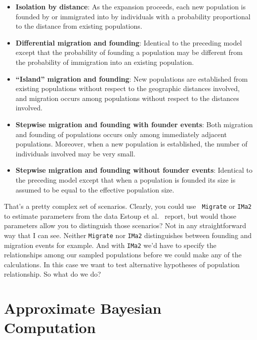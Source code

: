 \begin{itemize}

\item {\bf Isolation by distance}: As the expansion proceeds, each new
  population is founded by or immigrated into by individuals with a
  probability proportional to the distance from existing populations.

\item {\bf Differential migration and founding}: Identical to the
  preceding model except that the probability of founding a population
  may be different from the probability of immigration into an
  existing population.

\item {\bf ``Island'' migration and founding}: New populations are
  established from existing populations without respect to the
  geographic distances involved, and migration occurs among
  populations without respect to the distances involved.

\item {\bf Stepwise migration and founding with founder events}: Both
  migration and founding of populations occurs only among immediately
  adjacent populations. Moreover, when a new population is
  established, the number of individuals involved may be very small.

\item {\bf Stepwise migration and founding without founder events}:
  Identical to the preceding model except that when a population is
  founded its size is assumed to be equal to the effective population
  size. 

\end{itemize}

That's a pretty complex set of scenarios. Clearly, you could use {\tt
  Migrate} or {\tt IMa2} to estimate parameters from the data Estoup
et al.~\cite{Estoup-etal-2004} report, but would those parameters
allow you to distinguish those scenarios? Not in any straightforward
way that I can see. Neither {\tt Migrate} nor {\tt IMa2} distinguishes
between founding and migration events for example. And with {\tt IMa2}
we'd have to specify the relationships among our sampled populations
before we could make any of the calculations. In this case we want to
test alternative hypotheses of population relationship. So what do we
do?

\section*{Approximate Bayesian Computation}


